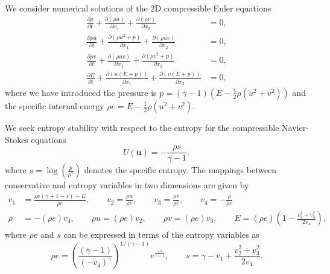 \documentclass{svjour3}                     %
\newcommand{\pd}[2]{\frac{\partial#1}{\partial#2}}
\newcommand{\LRp}[1]{\left( #1 \right)}
\begin{document}
We consider numerical solutions of the 2D compressible Euler equations
\begin{align*}
\pd{\rho}{t} + \pd{\LRp{\rho u}}{x_1} + \pd{\LRp{\rho v}}{x_2} &= 0,\\
\pd{\rho u}{t} + \pd{\LRp{\rho u^2 + p }}{x_1} + \pd{\LRp{\rho uv}}{x_2} &= 0,\nonumber\\
\pd{\rho v}{t} + \pd{\LRp{\rho uv}}{x_1} + \pd{\LRp{\rho v^2 + p }}{x_2} &= 0,\nonumber\\
\pd{E}{t} + \pd{\LRp{u(E+p)}}{x_1} + \pd{\LRp{v(E+p)}}{x_2}&= 0,\nonumber
\end{align*}
where we have introduced the pressure is $p = (\gamma-1)\LRp{E - \frac{1}{2}\rho (u^2+v^2)}$ and the specific internal energy $\rho e = E - \frac{1}{2}\rho (u^2+v^2)$.  

We seek entropy stability with respect to the entropy for the compressible Navier-Stokes equations \cite{hughes1986new}
\begin{equation*}
U(\bm{u}) = -\frac{\rho s}{\gamma-1},
\label{eq:entropy2d}
\end{equation*}
where $s = \log\LRp{\frac{p}{\rho^\gamma}}$ denotes the specific entropy. The mappings between conservative and entropy variables in two dimensions are given by
\begin{align*}
v_1 &= \frac{\rho e (\gamma + 1 - s) - E}{\rho e}, \qquad v_2 = \frac{\rho u}{\rho e}, \qquad v_3 = \frac{\rho v}{\rho e}, \qquad v_4 = -\frac{\rho}{\rho e}\\
\rho &= -(\rho e) v_4, \qquad \rho u = (\rho e) v_2, \qquad \rho v = (\rho e) v_3, \qquad E = (\rho e)\LRp{1 - \frac{{v_2^2+v_3^2}}{2 v_4}},
\end{align*}
where $\rho e$ and $s$ can be expressed in terms of the entropy variables as
\begin{equation*}
\rho e = \LRp{\frac{(\gamma-1)}{\LRp{-v_4}^{\gamma}}}^{1/(\gamma-1)}e^{\frac{-s}{\gamma-1}}, \qquad s = \gamma - v_1 + \frac{{v_2^2+v_3^2}}{2v_4}.
\end{equation*}
\end{document}
